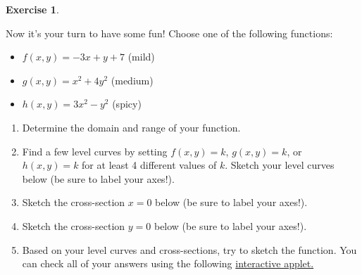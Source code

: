 \documentclass[
]{book}
\providecommand{\tightlist}{%
  \setlength{\itemsep}{0pt}\setlength{\parskip}{0pt}}
\theoremstyle{definition}
\theoremstyle{definition}
\theoremstyle{definition}
\newtheorem{exercise}{Exercise}[chapter]
\theoremstyle{definition}
\theoremstyle{remark}
\begin{document}
\begin{exercise}
\protect\hypertarget{exr:unlabeled-div-3}{}\label{exr:unlabeled-div-3}

Now it's your turn to have some fun! Choose one of the following functions:

\begin{itemize}
\tightlist
\item
  \(f(x,y) = -3x+y+7\) (mild)
\item
  \(g(x,y)=x^2+4y^2\) (medium)
\item
  \(h(x,y)=3x^2-y^2\) (spicy)
\end{itemize}

\begin{enumerate}
\def\labelenumi{\alph{enumi}.}
\tightlist
\item
  Determine the domain and range of your function.
\item
  Find a few level curves by setting \(f(x,y)=k\), \(g(x,y)=k\), or \(h(x,y)=k\) for at least 4 different values of \(k\). Sketch your level curves below (be sure to label your axes!).
\item
  Sketch the cross-section \(x=0\) below (be sure to label your axes!).
\item
  Sketch the cross-section \(y=0\) below (be sure to label your axes!).
\item
  Based on your level curves and cross-sections, try to sketch the function. You can check all of your answers using the following \href{https://www.geogebra.org/m/zpr5ggau}{interactive applet.}
\end{enumerate}

\end{exercise}
\end{document}
